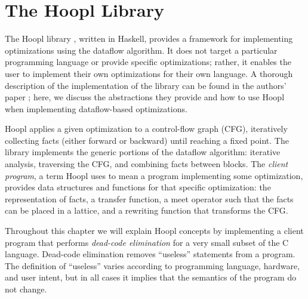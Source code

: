 \documentclass[12pt]{report}
\begin{document}

\chapter{The Hoopl Library}
\label{ref_chapter_hoopl}


The Hoopl library \citep{Hoopl-3.8.7.0}, written in Haskell, provides
a framework for implementing optimizations using the dataflow
algorithm. It does not target a particular programming language or
provide specific optimizations; rather, it enables the user to
implement their own optimizations for their own language. A
thorough description of the implementation of the library can be found
in the authors' paper \citep{Ramsey2010}; here, we discuss the
abstractions they provide and how to use Hoopl when implementing
dataflow-based optimizations.


Hoopl applies a given optimization to a control-flow graph (CFG),
iteratively collecting facts (either forward or backward) until
reaching a fixed point. The library implements the generic portions of
the dataflow algorithm: iterative analysis, traversing the CFG, and
combining facts between blocks. The \emph{client program}, a term
Hoopl uses to mean a program implementing some optimization, provides
data structures and functions for that specific optimization: the
representation of facts, a transfer function, a meet operator such
that the facts can be placed in a lattice, and a rewriting function
that transforms the CFG.




Throughout this chapter we will explain Hoopl concepts by implementing
a client program that performs \emph{dead-code elimination} for a very
small subset of the C language. Dead-code elimination removes
``useless'' statements from a program. The definition of ``useless''
varies according to programming language, hardware, and user intent,
but in all cases it implies that the semantics of the program do not
change.
\end{document}
